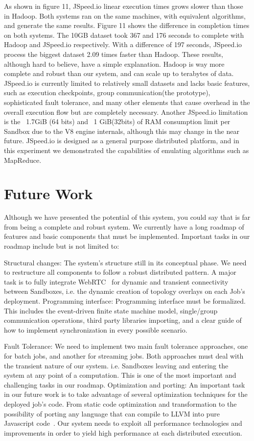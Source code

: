 \documentclass[10pt,reprint]{socc14}
\begin{document}
As shown in figure 11, JSpeed.io linear execution times grows slower than those in Hadoop. Both systems ran on the same machines, with equivalent algorithms, and generate the same results. Figure 11 shows the difference in completion times on both systems. The 10GB dataset took 367 and 176 seconds to complete with Hadoop and JSpeed.io respectively. With a difference of 197 seconds, JSpeed.io process the biggest dataset 2.09 times faster than Hadoop. These results, although hard to believe, have a simple explanation. Hadoop is way more complete and robust than our system, and can scale up to terabytes of data. JSpeed.io is currently limited to relatively small datasets and lacks basic features, such as execution checkpoints, group communication(the prototype), sophisticated fault tolerance, and many other elements that cause overhead in the overall execution flow but are completely necessary. Another JSpeed.io limitation is the  ~1.7GiB (64 bits) and ~1 GiB(32bits) of RAM consumption limit per Sandbox due to the V8 engine internals, although this may change in the near future.  JSpeed.io is designed as a general purpose distributed platform, and in this experiment we demonstrated the capabilities of emulating algorithms such as MapReduce.


\section{Future Work}

Although we have presented the potential of this system, you could say that is far from being a complete and robust system. We currently have a long roadmap of features and basic components that must be implemented. Important tasks in our roadmap include but is not limited to:

Structural changes: The system's structure still in its conceptual phase. We need to restructure all components to follow a robust distributed pattern. A major task is to fully integrate WebRTC~\cite{Vogt2013} for dynamic and transient connectivity between Sandboxes, i.e. the dynamic creation of topology overlays on each Job’s deployment.
Programming interface: Programming interface must be formalized. This includes the event-driven finite state machine model, single/group communication operations, third party libraries importing, and a clear guide of how to implement synchronization in every possible scenario.

Fault Tolerance: We need to implement two main fault tolerance approaches, one for batch jobs, and another for  streaming jobs. Both approaches must deal with the transient nature of our system. i.e. Sandboxes leaving and entering the system at any point of a computation. This is one of the most important and challenging tasks in our roadmap.
Optimization and porting: An important task in our future work is to take advantage of several optimization techniques for the deployed job’s code. From static code optimization and transformation to the possibility of porting any language that can compile to  LLVM into pure Javascript code~\cite{Zakai2011}. Our system needs to exploit all performance technologies and improvements in order to yield high performance at each distributed execution.
\end{document}
